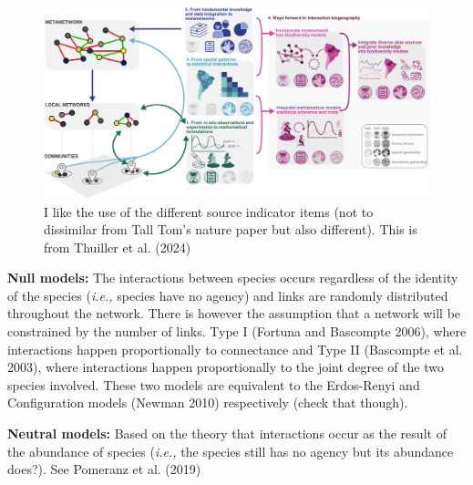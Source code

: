 \documentclass[
  letterpaper,
  DIV=11,
  numbers=noendperiod]{scrartcl}
\begin{document}
\begin{figure}[H]

{\centering \includegraphics{images/thullier_2023_concept.jpeg}

}

\caption{I like the use of the different source indicator items (not to
dissimilar from Tall Tom's nature paper but also different). This is
from Thuiller et al. (2024)}

\end{figure}%

\textbf{Null models:} The interactions between species occurs regardless
of the identity of the species (\emph{i.e.,} species have no agency) and
links are randomly distributed throughout the network. There is however
the assumption that a network will be constrained by the number of
links. Type I (Fortuna and Bascompte 2006), where interactions happen
proportionally to connectance and Type II (Bascompte et al. 2003), where
interactions happen proportionally to the joint degree of the two
species involved. These two models are equivalent to the Erdos-Renyi and
Configuration models (Newman 2010) respectively (check that though).

\textbf{Neutral models:} Based on the theory that interactions occur as
the result of the abundance of species (\emph{i.e.,} the species still
has no agency but its abundance does?). See Pomeranz et al. (2019)
\end{document}
